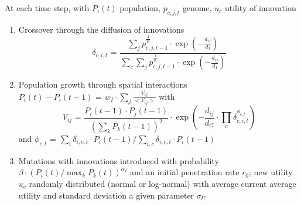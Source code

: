 {At each time step, with $P_i \left(t\right)$ population, $p_{c,j,t}$ genome, $u_c$ utility of innovation
\begin{enumerate}
	\item Crossover through the diffusion of innovations
	\[
	\delta_{c,i,t} \textrm{ = } \frac{\sum_j p_{c,j,t-1}^{\frac{1}{u_c}} \cdot \exp{\left(-\frac{d_{ij}}{d_I}\right)}}{\sum_c \sum_j p_{c,j,t-1}^{\frac{1}{u_c}} \cdot \exp{\left(-\frac{d_{ij}}{d_I}\right)}}	
	\]
	\item Population growth through spatial interactions $P_i\left(t\right) - P_i\left(t-1\right) \textrm{ = } w_I\cdot \sum_j \frac{V_{ij}}{<V_{ij}>}$ with
	\[ 
	V_{ij} \textrm{ = } \frac{P_{i}\left(t-1\right) \cdot P_{j}\left(t-1\right)}{\left(\sum_k P_k\left(t-1\right)\right)^2} \cdot \exp{\left(-\frac{d_{ij}}{d_G} \cdot \prod_c \delta_{c,i,t}^{\phi_{c,t}}\right)}
	\]
	and $\phi_{c,t} \textrm{ = } \sum_i \delta_{i,c,t}\cdot P_i\left(t-1\right) /\sum_{i,c} \delta_{i,c,t}\cdot P_{i}\left(t-1\right)$
	\item Mutations with innovations introduced with probability $\beta \cdot \left(P_i \left(t\right) / \max_k P_k \left(t\right)\right)^{\alpha_I}$ and an initial penetration rate $r_0$; new utility $u_c$ randomly distributed (normal or log-normal) with average current average utility and standard deviation a given parameter $\sigma_U$
\end{enumerate}



}


